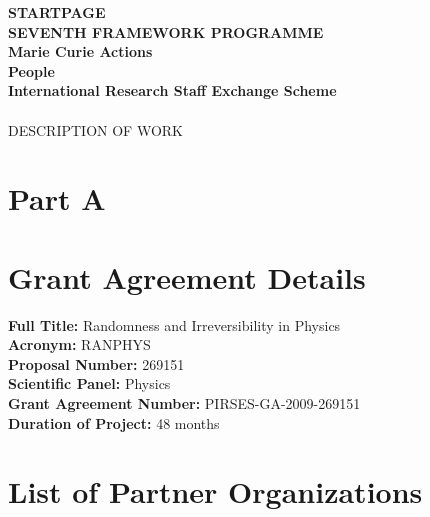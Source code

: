\documentclass[12pt]{article}
\begin{document}
\pagestyle{empty}
\sloppy

\begin{center}
{\Large
$\;$\\
{\bf STARTPAGE}\\
$\;$\\
$\;$\\
$\;$\\
{\bf SEVENTH FRAMEWORK PROGRAMME\\
Marie Curie Actions\\
People                \\
International Research Staff Exchange Scheme\\
$\;$\\
\\
}
$\;$\\
$\;$\\
DESCRIPTION OF WORK }
\end{center}

\newpage

\pagestyle{mainA}

\section*{Part A}
\section{Grant Agreement Details}

\begin{flushleft}
{\bf Full Title:} Randomness and Irreversibility in Physics\\
$\;$\\
{\bf Acronym:} RANPHYS\\
$\;$\\
{\bf Proposal Number:} 269151\\
$\;$\\
{\bf Scientific Panel:} Physics\\
$\;$\\
{\bf Grant Agreement Number:}  PIRSES-GA-2009-269151\\
$\;$\\
{\bf Duration of Project:} 48 months\\
\end{flushleft}

\section{List of Partner Organizations}
\end{document}
